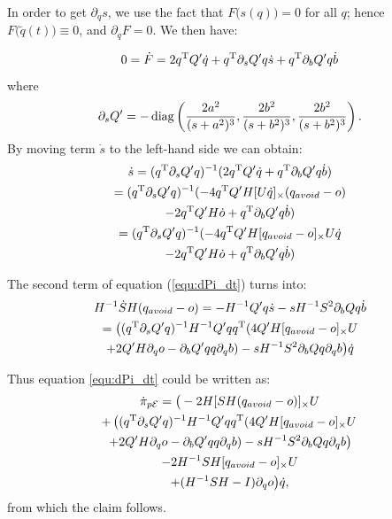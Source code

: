 \documentclass[journal]{IEEEtran}  %
\begin{document}
    In order to get $\partial_q s$, we use the fact that $F\bigl(s(q)\bigr)=0$ for all $q$; hence $F\bigl(\tilde{q}(t)\bigr)\equiv 0$, and $\partial_q F = 0$. We then have:

    \begin{equation}
      0=\dot F =  2q^\mathrm{T} Q' \dot q + q^\mathrm{T} \partial_s Q' q \dot s + q^\mathrm{T} \partial_bQ' q \dot b
    \end{equation}
    where
    \begin{equation}
      \partial_s Q'= -\operatorname{diag}\left(\frac{2a^2}{(s+a^2)^3},\frac{2b^2}{(s+b^2)^3},\frac{2b^2}{(s+b^2)^3}\right).
    \end{equation}
    By moving term $\dot s$ to the left-hand side we can obtain:
    \begin{multline}\label{equ:s_dot}
      \dot s =  (q^\mathrm{T} \partial_s Q' q)^{-1} (2q^\mathrm{T} Q' \dot q + q^\mathrm{T} \partial_b Q' q \dot b)\\
      =  (q^\mathrm{T} \partial_s Q' q)^{-1} (-4q^\mathrm{T} Q' H[U\dot q]_\times (q_{avoid} - o) \\
      -2q^\mathrm{T} Q'H\dot o + q^\mathrm{T} \partial_b Q' q \dot b)\\
      =  (q^\mathrm{T} \partial_s Q' q)^{-1} (-4q^\mathrm{T} Q' H[q_{avoid} - o]_\times U\dot q \\
      -2q^\mathrm{T} Q'H\dot o + q^\mathrm{T} \partial_b Q' q \dot b)
    \end{multline}

    The second term of equation (\ref{equ:dPi_dt}) turns into:
    \begin{multline}
      H^{-1}\dot S H (q_{avoid} - o)
      = - H^{-1} Q' q \dot s - s H^{-1} S^2 \partial_b Q q \dot b\\
      =   \big( (q^\mathrm{T} \partial_s Q' q)^{-1} H^{-1} Q' q q^\mathrm{T}  (4Q' H[q_{avoid} - o]_\times U  \\
      + 2Q' H\partial_q o - \partial_b Q' q q \partial_q b) -  s H^{-1} S^2 \partial_b Q q \partial_q b\big) \dot q\\
    \end{multline}

    Thus equation \eqref{equ:dPi_dt} could be written as:
    \begin{multline}
      \dot \pi_{p\mathcal{E}} = \big(-2 H [ SH(q_{avoid}-o)]_{\times}U   \\
      + \left( (q^\mathrm{T} \partial_s Q' q)^{-1} H^{-1} Q' q q^\mathrm{T}  (4Q' H[q_{avoid} - o]_\times U \right. \\
      \left.+ 2Q' H\partial_q o - \partial_b Q' q q \partial_q b) -  s H^{-1} S^2 \partial_b Q q \partial_q b\right) \\
      -2H^{-1} S H[q_{avoid}-o]_{\times} U  \\
      + (H^{-1}SH -I)\partial_q o \big) \dot q,
    \end{multline}
    from which the claim follows.
  
\end{document}
